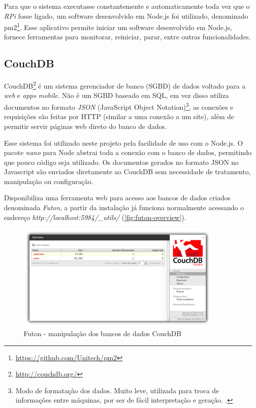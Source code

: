 Para que o sistema executasse constantemente e automaticamente toda vez que o \textit{RPi} fosse ligado, um software desenvolvido em Node.js foi utilizado, denominado pm2\footnote{\url{https://github.com/Unitech/pm2}}. Esse aplicativo permite iniciar um software desenvolvido em Node.js, fornece ferramentas para monitorar, reiniciar, parar, entre outras funcionalidades.

\subsection{CouchDB}\label{sec:couchdb}

CouchDB\footnote{\url{http://couchdb.org/}} é um sistema gerenciador de banco (SGBD) de dados voltado para a \textit{web} e \textit{apps mobile}. Não é um SGBD baseado em SQL, em vez disso utiliza documentos no formato \textit{JSON} (JavaScript Object Notation)\footnote{Modo de formatação dos dados. Muito leve, utilizada para troca de informações entre máquinas, por ser de fácil interpretação e geração. \cite{json-couch}.}, as conexões e requisições são feitas por HTTP (similar a uma conexão a um site), além de permitir servir páginas web direto do banco de dados.

Esse sistema foi utilizado neste projeto pela facilidade de uso com o Node.js. O pacote \textit{nano} para Node abstrai toda a conexão com o banco de dados, permitindo que pouco código seja utilizado. Os documentos gerados no formato JSON no Javascript são enviados diretamente ao CouchDB sem necessidade de tratamento, manipulação ou configuração.

Disponibiliza uma ferramenta web para acesso aos bancos de dados criados denominada \textit{Futon}, a partir da instalação já funciona normalmente acessando o endereço \textit{http://localhost:5984/\_utils/} (\autoref{fig:futon-overview}).

\begin{figure}[htb]
	\caption{\label{fig:futon-overview}Futon - manipulação dos bancos de dados CouchDB}
	\begin{center}
		\includegraphics[width=0.9\textwidth]{img/futon-overview.png}
	\end{center}
\end{figure}

